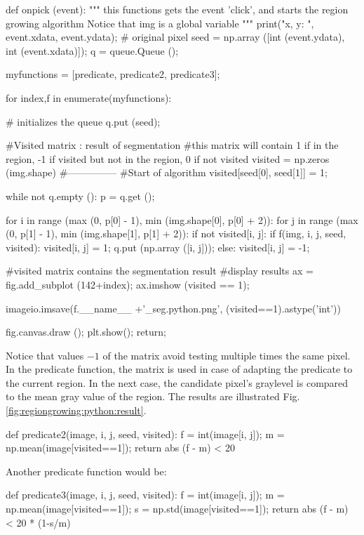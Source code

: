 \begin{python}
def onpick (event):
    """
    this functions gets the event 'click', and starts the region growing algorithm
    Notice that img is a global variable
    """
    print("x, y: ", event.xdata, event.ydata);
    # original pixel
    seed = np.array ([int (event.ydata), int (event.xdata)]);
    q = queue.Queue ();
    
    myfunctions = [predicate, predicate2, predicate3];

    for index,f in enumerate(myfunctions):     
        
        # initializes the queue
        q.put (seed);
   
        #Visited matrix : result of segmentation
        #this matrix will contain 1 if in the region, -1 if visited but not in the region, 0 if not visited
        visited = np.zeros (img.shape)
        #---------------
        #Start of algorithm
        visited[seed[0], seed[1]] = 1;
        
        while not q.empty ():
            p = q.get ();
    
            for i in range (max (0, p[0] - 1), min (img.shape[0], p[0] + 2)):
                for j in range (max (0, p[1] - 1), min (img.shape[1], p[1] + 2)):
                    if not visited[i, j]:
                        if f(img, i, j, seed, visited):
                            visited[i, j] = 1;
                            q.put (np.array ([i, j]));
                        else:
                            visited[i, j] = -1;
        
        #visited matrix contains the segmentation result
        #display results
        ax = fig.add_subplot (142+index);
        ax.imshow (visited == 1);

        imageio.imsave(f.__name__ +'_seg.python.png', (visited==1).astype('int'))
        
    fig.canvas.draw ();
    plt.show();
    return;
\end{python}

Notice that values $-1$ of the  matrix avoid testing multiple times the same pixel. In the predicate function, the  matrix is used in case of adapting the predicate to the current region. In the next case, the candidate pixel's graylevel is compared to the mean gray value of the region. The results are illustrated Fig.\ref{fig:regiongrowing:python:result}.

\begin{python}
def predicate2(image, i, j, seed, visited):   
    f = int(image[i, j]);
    m = np.mean(image[visited==1]);
    return abs (f - m) < 20 
\end{python}
Another predicate function would be:
\begin{python}
def predicate3(image, i, j, seed, visited):   
    f = int(image[i, j]);
    m = np.mean(image[visited==1]);
    s = np.std(image[visited==1]);
    return abs (f - m) < 20 * (1-s/m)
\end{python}

